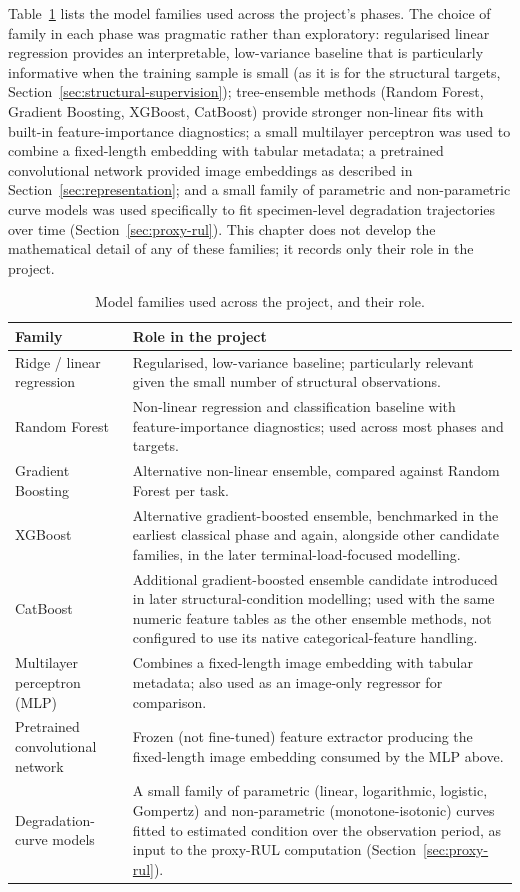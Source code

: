 Table~\ref{tab:model-families} lists the model families used across the
project's phases. The choice of family in each phase was pragmatic rather
than exploratory: regularised linear regression provides an
interpretable, low-variance baseline that is particularly informative
when the training sample is small (as it is for the structural targets,
Section~\ref{sec:structural-supervision}); tree-ensemble methods
(Random Forest, Gradient Boosting, XGBoost, CatBoost) provide stronger
non-linear fits with built-in feature-importance diagnostics; a small
multilayer perceptron was used to combine a fixed-length embedding with
tabular metadata; a pretrained convolutional network provided image
embeddings as described in Section~\ref{sec:representation}; and a small
family of parametric and non-parametric curve models was used specifically
to fit specimen-level degradation trajectories over time
(Section~\ref{sec:proxy-rul}). This chapter does not develop the
mathematical detail of any of these families; it records only their role
in the project.

\begin{table}[htbp]
\centering
\caption{Model families used across the project, and their role.}
\label{tab:model-families}
\begin{tabular}{p{4.3cm}p{8.9cm}}
\toprule
Family & Role in the project \\
\midrule
Ridge / linear regression & Regularised, low-variance baseline;
particularly relevant given the small number of structural observations. \\
Random Forest & Non-linear regression and classification baseline with
feature-importance diagnostics; used across most phases and targets. \\
Gradient Boosting & Alternative non-linear ensemble, compared against
Random Forest per task. \\
XGBoost & Alternative gradient-boosted ensemble, benchmarked in the
earliest classical phase and again, alongside other candidate families,
in the later terminal-load-focused modelling. \\
CatBoost & Additional gradient-boosted ensemble candidate introduced in
later structural-condition modelling; used with the same numeric feature
tables as the other ensemble methods, not configured to use its native
categorical-feature handling. \\
Multilayer perceptron (MLP) & Combines a fixed-length image embedding
with tabular metadata; also used as an image-only regressor for
comparison. \\
Pretrained convolutional network & Frozen (not fine-tuned) feature
extractor producing the fixed-length image embedding consumed by the
MLP above. \\
Degradation-curve models & A small family of parametric (linear,
logarithmic, logistic, Gompertz) and non-parametric (monotone-isotonic)
curves fitted to estimated condition over the observation period, as
input to the proxy-RUL computation (Section~\ref{sec:proxy-rul}). \\
\bottomrule
\end{tabular}
\end{table}

